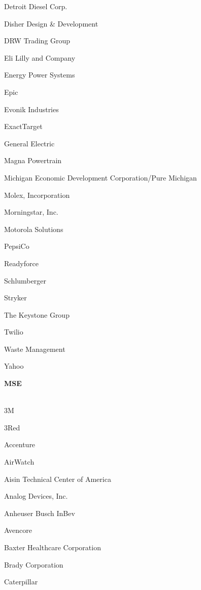 \documentclass[twoside]{article}
\begin{document}
\begin{center}
\begin{multicols}{5}
\begin{FlushLeft}
\begin{compactitem}
\item Detroit Diesel Corp.
\item Disher Design \& Development
\item DRW Trading Group
\item Eli Lilly and Company
\item Energy Power Systems
\item Epic
\item Evonik Industries
\item ExactTarget
\item General Electric
\item Magna Powertrain
\item Michigan Economic Development Corporation/Pure Michigan
\item Molex, Incorporation
\item Morningstar, Inc.
\item Motorola Solutions
\item PepsiCo
\item Readyforce
\item Schlumberger
\item Stryker
\item The Keystone Group
\item Twilio
\item Waste Management
\item Yahoo
\end{compactitem}
        \end{FlushLeft}
        \vspace{1em}
        {\fontsize{14}{16}\selectfont \bf MSE}\\
        \vspace{-1em}
        ~\hrulefill~
        \vspace{-.9em}
        \begin{FlushLeft}
        \begin{compactitem}
        \item 3M
\item 3Red
\item Accenture
\item AirWatch
\item Aisin Technical Center of America
\item Analog Devices, Inc.
\item Anheuser Busch InBev
\item Avencore
\item Baxter Healthcare Corporation
\item Brady Corporation
\item Caterpillar

\end{compactitem}
\end{FlushLeft}
\end{multicols}
\end{center}
\end{document}
